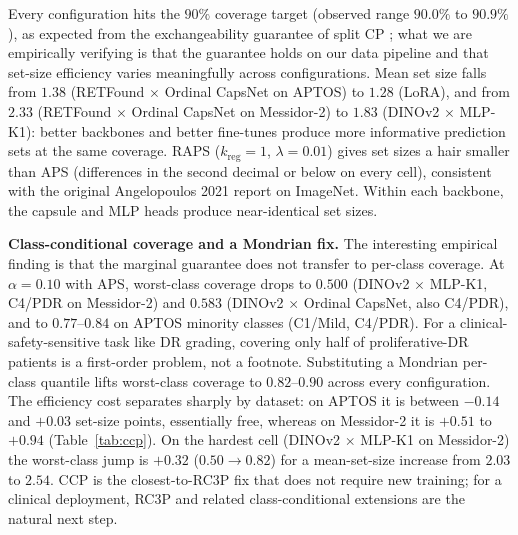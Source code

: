 \documentclass[journal]{IEEEtran}
\begin{document}
Every configuration hits the $90\%$ coverage target (observed range $90.0\%$ to $90.9\%$), as expected from the exchangeability guarantee of split CP \cite{ref:vovk_conformal}; what we are empirically verifying is that the guarantee holds on our data pipeline and that set-size efficiency varies meaningfully across configurations. Mean set size falls from $1.38$ (RETFound $\times$ Ordinal CapsNet on APTOS) to $1.28$ (LoRA), and from $2.33$ (RETFound $\times$ Ordinal CapsNet on Messidor-2) to $1.83$ (DINOv2 $\times$ MLP-K1): better backbones and better fine-tunes produce more informative prediction sets at the same coverage. RAPS \cite{ref:raps} ($k_{\text{reg}}=1$, $\lambda=0.01$) gives set sizes a hair smaller than APS (differences in the second decimal or below on every cell), consistent with the original Angelopoulos 2021 report on ImageNet. Within each backbone, the capsule and MLP heads produce near-identical set sizes.

\textbf{Class-conditional coverage and a Mondrian fix.} The interesting empirical finding is that the marginal guarantee does not transfer to per-class coverage. At $\alpha = 0.10$ with APS, worst-class coverage drops to $0.500$ (DINOv2 $\times$ MLP-K1, C4/PDR on Messidor-2) and $0.583$ (DINOv2 $\times$ Ordinal CapsNet, also C4/PDR), and to $0.77$--$0.84$ on APTOS minority classes (C1/Mild, C4/PDR). For a clinical-safety-sensitive task like DR grading, covering only half of proliferative-DR patients is a first-order problem, not a footnote. Substituting a Mondrian \cite{ref:mondrian} per-class quantile lifts worst-class coverage to $0.82$--$0.90$ across every configuration. The efficiency cost separates sharply by dataset: on APTOS it is between $-0.14$ and $+0.03$ set-size points, essentially free, whereas on Messidor-2 it is $+0.51$ to $+0.94$ (Table~\ref{tab:ccp}). On the hardest cell (DINOv2 $\times$ MLP-K1 on Messidor-2) the worst-class jump is $+0.32$ ($0.50 \to 0.82$) for a mean-set-size increase from $2.03$ to $2.54$. CCP is the closest-to-RC3P \cite{ref:rank_conformal} fix that does not require new training; for a clinical deployment, RC3P and related class-conditional extensions are the natural next step.
\end{document}
